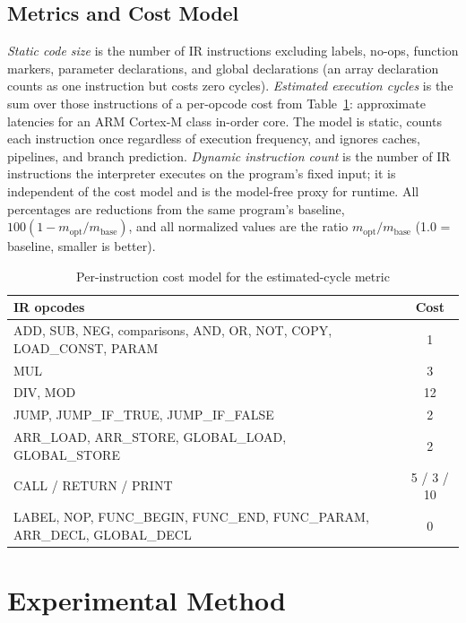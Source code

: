 \documentclass[conference]{IEEEtran}
\begin{document}
\subsection{Metrics and Cost Model}
\label{sec:metrics}
\textit{Static code size} is the number of IR instructions excluding labels, no-ops, function markers, parameter declarations, and global declarations (an array declaration counts as one instruction but costs zero cycles). \textit{Estimated execution cycles} is the sum over those instructions of a per-opcode cost from Table~\ref{tab:cost_model}: approximate latencies for an ARM Cortex-M class in-order core. The model is static, counts each instruction once regardless of execution frequency, and ignores caches, pipelines, and branch prediction. \textit{Dynamic instruction count} is the number of IR instructions the interpreter executes on the program's fixed input; it is independent of the cost model and is the model-free proxy for runtime. All percentages are reductions from the same program's baseline, $100 (1 - m_{\mathrm{opt}}/m_{\mathrm{base}})$, and all normalized values are the ratio $m_{\mathrm{opt}}/m_{\mathrm{base}}$ (1.0 = baseline, smaller is better).

\begin{table}[!htbp]
\centering
\caption{Per-instruction cost model for the estimated-cycle metric}
\label{tab:cost_model}
\renewcommand{\arraystretch}{1.05}
{\footnotesize
\begin{tabularx}{\columnwidth}{@{}>{\raggedright\arraybackslash}Xc@{}}
\toprule
\textbf{IR opcodes} & \textbf{Cost} \\
\midrule
ADD, SUB, NEG, comparisons, AND, OR, NOT, COPY, LOAD\_CONST, PARAM & 1 \\
MUL & 3 \\
DIV, MOD & 12 \\
JUMP, JUMP\_IF\_TRUE, JUMP\_IF\_FALSE & 2 \\
ARR\_LOAD, ARR\_STORE, GLOBAL\_LOAD, GLOBAL\_STORE & 2 \\
CALL / RETURN / PRINT & 5 / 3 / 10 \\
LABEL, NOP, FUNC\_BEGIN, FUNC\_END, FUNC\_PARAM, ARR\_DECL, GLOBAL\_DECL & 0 \\
\bottomrule
\end{tabularx}
}
\end{table}

\section{Experimental Method}
\label{sec:setup}
\end{document}
